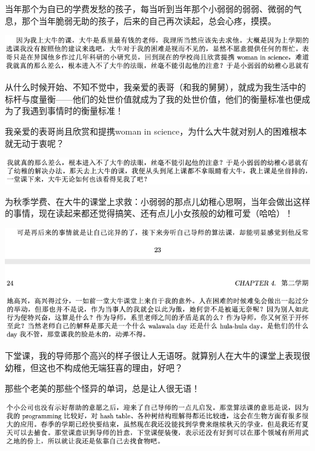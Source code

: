 \documentclass[9pt, b5paper]{article}
\begin{document}
当年那个为自已的学费发愁的孩子，每当听到当年那个小弱弱的弱弱、微弱的气息，那个当年脆弱无助的孩子，后来的自己再次读起，总会心疼，摸摸。

\begin{center}
\includegraphics[width=.9\linewidth]{./pic/backups_plans_20210424_213859.png}
\end{center}

从什么时候开始、不知不觉中，我亲爱的表哥（和我的舅舅），就成为我生活中的标杆与度量衡——他们的处世价值就成为了我的处世价值，他们的衡量标准也便成为了我遇到事情时的衡量标准！

我亲爱的表哥尚且欣赏和提携woman in science，为什么大牛就对别人的困难根本就无动于衷呢？

\begin{center}
\includegraphics[width=.9\linewidth]{./pic/backups_plans_20210424_213910.png}
\end{center}

为秋季学费、在大牛的课堂上求救：小弱弱的那点儿幼稚心思啊，当年会做出这样的事情，现在读起来都还觉得搞笑、还有点儿小女孩般的幼稚可爱（哈哈）！

\begin{center}
\includegraphics[width=.9\linewidth]{./pic/backups_plans_20210424_213954.png}
\end{center}

下堂课，我的导师那个高兴的样子很让人无语呀。就算别人在大牛的课堂上表现很幼稚，但这也不构成他无端狂喜的理由，好吧？

那些个老美的那些个怪异的单词，总是让人很无语！

\begin{center}
\includegraphics[width=.9\linewidth]{./pic/backups_plans_20210424_214124.png}
\end{center}
\end{document}
